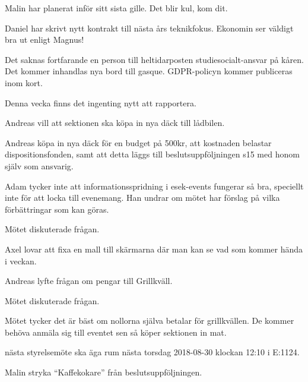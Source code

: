 \documentclass[10pt]{article}
\begin{document}
\begin{paragrafer}
\begin{paragrafer}
		Malin har planerat inför sitt sista gille. Det blir kul, kom dit.

		Daniel har skrivt nytt kontrakt till nästa års teknikfokus.
		Ekonomin ser väldigt bra ut enligt Magnus!
				
				
		Det saknas fortfarande en person till heltidarposten studiesocialt-ansvar på kåren. Det kommer inhandlas nya bord till gasque. GDPR-policyn kommer publiceras inom kort.  

				
		Denna vecka finns det ingenting nytt att rapportera.
						
	\end{paragrafer}
		
	
		Andreas vill att sektionen ska köpa in nya däck till lådbilen.

		Andreas \ypa köpa in nya däck för en budget på 500kr, att kostnaden belastar dispositionsfonden, samt att detta läggs till beslutsuppföljningen s15 med honom själv som ansvarig. 
	
		\Mbaby


	Adam tycker inte att informationsspridning i esek-events fungerar så bra, speciellt inte för att locka till evenemang.
	Han undrar om mötet har förslag på vilka förbättringar som kan göras. 

	Mötet diskuterade frågan.

	Axel lovar att fixa en mall till skärmarna där man kan se vad som kommer hända i veckan.
	
	
	Andreas lyfte frågan om pengar till Grillkväll. 
	
	Mötet diskuterade frågan.

	Mötet tycker det är bäst om nollorna själva betalar för grillkvällen. De kommer behöva anmäla sig till eventet sen så köper sektionen in mat.

	\Mba nästa styrelsemöte ska äga rum nästa torsdag 2018-08-30 klockan 12:10 i E:1124.
		  
		
	Malin \ypa stryka ``Kaffekokare'' från beslutsuppföljningen.
	

\end{paragrafer}
\end{document}
